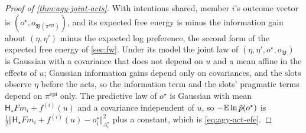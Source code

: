 \begin{proof}[Proof of \cref{thm:agy-joint-acts}]
With intentions shared, member $i$'s outcome vector is $(o^\star,o_{\mathfrak B(\pi^{\mathrm{epi}})})$, and its expected free energy is minus the information gain about $(\eta,\eta')$ minus the expected log preference, the second form of the expected free energy of \cref{sec:fw}. Under its model the joint law of $(\eta,\eta',o^\star,o_{\mathfrak B})$ is Gaussian with a covariance that does not depend on $u$ and a mean affine in the effects of $u$; Gaussian information gains depend only on covariances, and the slots observe $\eta$ before the acts, so the information term and the slots' pragmatic terms depend on $\pi^{\mathrm{epi}}$ only. The predictive law of $o^\star$ is Gaussian with mean $\mathsf H_\star Fm_i+f^{(i)}(u)$ and a covariance independent of $u$, so $-\mathbb{E}\ln\tilde p(o^\star)$ is $\frac12\Vert\mathsf H_\star Fm_i+f^{(i)}(u)-o^\star_i\Vert^2_{\Lambda^\star_i}$ plus a constant, which is \eqref{eq:agy-act-efe}.


\end{proof}
